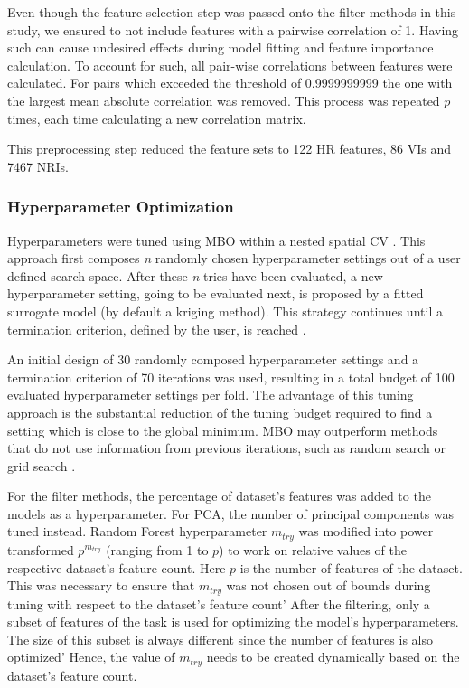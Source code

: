 \documentclass[letterpaper, peerreview]{IEEEtran}
\begin{document}
Even though the feature selection step was passed onto the filter methods in this study, we ensured to not include features with a pairwise correlation of 1.
Having such can cause undesired effects during model fitting and feature importance calculation.
To account for such, all pair-wise correlations between features were calculated.
For pairs which exceeded the threshold of 0.9999999999 the one with the largest mean absolute correlation was removed.
This process was repeated $p$ times, each time calculating a new correlation matrix.

This preprocessing step reduced the feature sets to 122 HR features, 86 VIs and 7467 NRIs.

\subsubsection{Hyperparameter Optimization}

\noindent Hyperparameters were tuned using \ac{MBO} within a nested spatial CV \cite{mlrmbo, schratz2019}.
This approach first composes \textit{n} randomly chosen hyperparameter settings out of a user defined search space.
After these \textit{n} tries have been evaluated, a new hyperparameter setting, going to be evaluated next, is proposed by a fitted surrogate model (by default a kriging method).
This strategy continues until a termination criterion, defined by the user, is reached \cite{hutter2011, jones1998}.

An initial design of 30 randomly composed hyperparameter settings and a termination criterion of 70 iterations was used, resulting in a total budget of 100 evaluated hyperparameter settings per fold.
The advantage of this tuning approach is the substantial reduction of the tuning budget required to find a setting which is close to the global minimum.
\ac{MBO} may outperform methods that do not use information from previous iterations, such as random search or grid search \cite{bergstra2012}.

For the filter methods, the percentage of dataset's features was added to the models as a hyperparameter.
For \ac{PCA}, the number of principal components was tuned instead.
Random Forest hyperparameter \texttt{\(m_{try}\)} was modified into power transformed \(p^{m_{try}}\) (ranging from 1 to $p$) to work on relative values of the respective dataset's feature count.
Here \(p\) is the number of features of the dataset.
This was necessary to ensure that \texttt{\(m_{try}\)} was not chosen out of bounds during tuning with respect to the dataset's feature count'
After the filtering, only a subset of features of the task is used for optimizing the model's hyperparameters.
The size of this subset is always different since the number of features is also optimized'
Hence, the value of \texttt{\(m_{try}\)} needs to be created dynamically based on the dataset's feature count.
\end{document}
